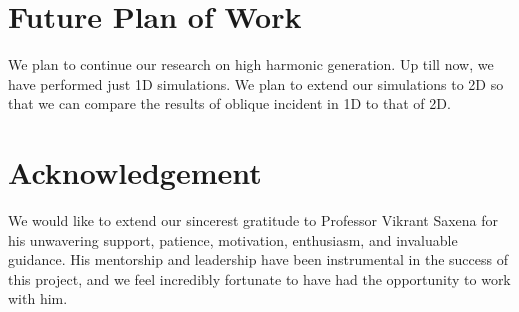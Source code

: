 \documentclass[12pt]{article}
\begin{document}
\section{Future Plan of Work}
We plan to continue our research on high harmonic generation. Up till now, we have performed just 1D simulations. We plan to extend our simulations to 2D so that we can compare the results of oblique incident in 1D to that of 2D.

\section{Acknowledgement}
We would like to extend our sincerest gratitude to Professor Vikrant Saxena for his unwavering support, patience, motivation, enthusiasm, and invaluable guidance. His mentorship and leadership have been instrumental in the success of this project, and we feel incredibly fortunate to have had the opportunity to work with him.
\printbibliography
\end{document}

